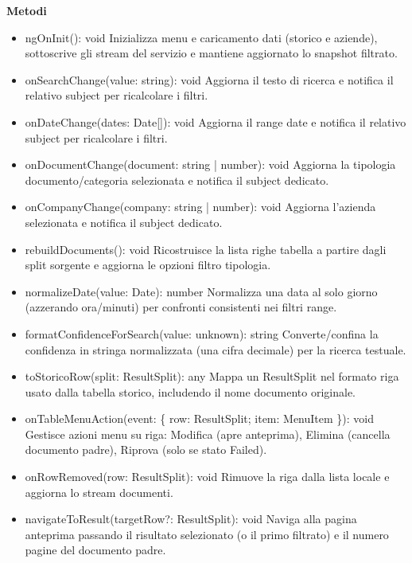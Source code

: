 \documentclass[a4paper,11pt]{article}
\begin{document}
\textbf{Metodi}
\begin{itemize}[noitemsep, topsep=0pt]
\item ngOnInit(): void
Inizializza menu e caricamento dati (storico e aziende), sottoscrive gli stream del servizio e mantiene aggiornato lo snapshot filtrato.

\item onSearchChange(value: string): void
Aggiorna il testo di ricerca e notifica il relativo subject per ricalcolare i filtri.

\item onDateChange(dates: Date[]): void
Aggiorna il range date e notifica il relativo subject per ricalcolare i filtri.

\item onDocumentChange(document: string | number): void
Aggiorna la tipologia documento/categoria selezionata e notifica il subject dedicato.

\item onCompanyChange(company: string | number): void
Aggiorna l’azienda selezionata e notifica il subject dedicato.

\item rebuildDocuments(): void
Ricostruisce la lista righe tabella a partire dagli split sorgente e aggiorna le opzioni filtro tipologia.

\item normalizeDate(value: Date): number
Normalizza una data al solo giorno (azzerando ora/minuti) per confronti consistenti nei filtri range.

\item formatConfidenceForSearch(value: unknown): string
Converte/confina la confidenza in stringa normalizzata (una cifra decimale) per la ricerca testuale.

\item toStoricoRow(split: ResultSplit): any
Mappa un ResultSplit nel formato riga usato dalla tabella storico, includendo il nome documento originale.

\item onTableMenuAction(event: \{ row: ResultSplit; item: MenuItem \}): void
Gestisce azioni menu su riga: Modifica (apre anteprima), Elimina (cancella documento padre), Riprova (solo se stato Failed).

\item onRowRemoved(row: ResultSplit): void
Rimuove la riga dalla lista locale e aggiorna lo stream documenti.

\item navigateToResult(targetRow?: ResultSplit): void
Naviga alla pagina anteprima passando il risultato selezionato (o il primo filtrato) e il numero pagine del documento padre.
\end{itemize}
\end{document}
